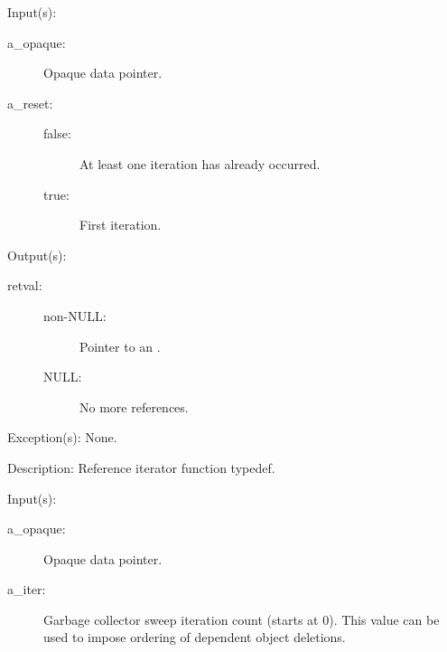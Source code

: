 \begin{capi}
\label{cw_nxo_class_ref_iter_t}
	\begin{capilist}
	\item[Input(s): ]
		\begin{description}\item[]
		\item[a\_opaque: ]
			Opaque data pointer.
		\item[a\_reset: ]
			\begin{description}\item[]
			\item[false: ]
				At least one iteration has already occurred.
			\item[true: ]
				First iteration.
			\end{description}
		\end{description}
	\item[Output(s): ]
		\begin{description}\item[]
		\item[retval: ]
			\begin{description}\item[]
			\item[non-NULL: ]
				Pointer to an .
			\item[NULL: ]
				No more references.
			\end{description}
		\end{description}
	\item[Exception(s): ] None.
	\item[Description: ]
		Reference iterator function typedef.
	\end{capilist}
\label{cw_nxo_class_delete_t}
	\begin{capilist}
	\item[Input(s): ]
		\begin{description}\item[]
		\item[a\_opaque: ]
			Opaque data pointer.
		\item[a\_iter: ]
			Garbage collector sweep iteration count (starts at 0).
			This value can be used to impose ordering of dependent
			object deletions.
		\end{description}

\end{capilist}
\end{capi}
